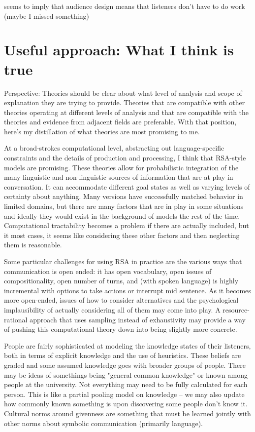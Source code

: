 \documentclass[]{article}
\begin{document}
\cite{keysar2000} seems to imply that audience design means that listeners don't have to do work (maybe I missed something) 







\section{Useful approach: What I think is true}

Perspective: Theories should be clear about what level of analysis and scope of explanation they are trying to provide. Theories that are compatible with other theories operating at different levels of analysis and that are compatible with the theories and evidence from adjacent fields are preferable. With that position, here's my distillation of what theories are most promising to me. 

At a broad-strokes computational level, abstracting out language-specific constraints and the details of production and processing, I think that RSA-style models are promising. These theories allow for probabilistic integration of the many linguistic and non-linguistic sources of information that are at play in conversation. It can accommodate different goal states as well as varying levels of certainty about anything. Many versions have successfully matched behavior in limited domains, but there are many factors that are in play in some situations and ideally they would exist in the background of models the rest of the time. Computational tractability becomes a problem if there are actually included, but it most cases, it seems like considering these other factors and then neglecting them is reasonable. 

Some particular challenges for using RSA in practice are the various ways that communication is open ended: it has open vocabulary, open issues of compositionality, open number of turns, and (with spoken language) is highly incremental with options to take actions or interrupt mid sentence. As it becomes more open-ended, issues of how to consider alternatives and the psychological implausibility of actually considering all of them may come into play. A resource-rational approach that uses sampling instead of exhaustivity may provide a way of pushing this computational theory down into being slightly more concrete. 

People are fairly sophisticated at modeling the knowledge states of their listeners, both in terms of explicit knowledge and the use of heuristics. These beliefs are graded and some assumed knowledge goes with broader groups of people. There may be ideas of somethings being "general common knowledge" or known among people at the university. Not everything may need to be fully calculated for each person. This is like a partial pooling model on knowledge -- we may also update how commonly known something is upon discovering some people don't know it. Cultural norms around givenness are something that must be learned jointly with other norms about symbolic communication (primarily language). 
\end{document}
